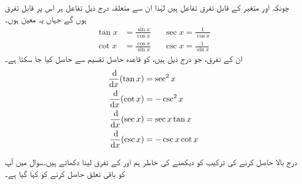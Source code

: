 چونکہ  اور  متغیر  کے قابل تفرق تفاعل ہیں لہٰذا ان سے متعلقہ درج ذیل تفاعل ہر اس   پر قابل تفرق ہوں گے جہاں یہ معین ہوں۔
\begin{align*}
\tan x&=\frac{\sin x}{\cos x}&&\sec x=\frac{1}{\cos x}\\[0.5em]
\cot x&=\frac{\cos x}{\sin x}&& \csc x=\frac{1}{\sin x}
\end{align*} 
ان کے تفرق،  جو درج ذیل ہیں،  کو قاعدہ حاصل تقسیم سے حاصل کیا جا سکتا ہے۔ 
\begin{gather}
\begin{aligned}\label{مساوات_تفرق_تکونیاتی_تفاعل_الف}
\frac{\dif}{\dif x}(\tan x)&=\sec^2 x\\
\frac{\dif}{\dif x}(\cot x)&=-\csc^2x\\
\frac{\dif}{\dif x}(\sec x)&=\sec x\tan x\\
\frac{\dif}{\dif x}(\csc x)&=-\csc x\cot x
\end{aligned}
\end{gather}

درج بالا حاصل کرنے کی ترکیب کو دیکھنے کی خاطر ہم  اور  کے تفرق لینا دکھاتے ہیں۔سوال میں آپ کو باقی تعلق حاصل کرنے کو کہا گیا ہے۔

